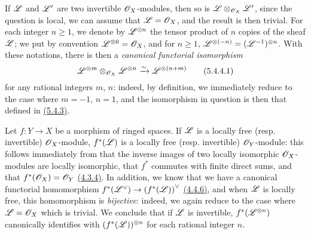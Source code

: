 \begin{env}[5.4.4]
\label{env-0.5.4.4}
If $\mathscr{L}$ and $\mathscr{L}'$ are two invertible $\mathscr{O}_X$-modules, then so is
$\mathscr{L}\otimes_{\mathscr{O}_X}\mathscr{L}'$, since the question is local, we can assume that
$\mathscr{L}=\mathscr{O}_X$, and the result is then trivial. For each integer $n\geqslant 1$,
we denote by $\mathscr{L}^{\otimes n}$ the tensor product of $n$ copies of the sheaf
$\mathscr{L}$; we put by convention $\mathscr{L}^{\otimes 0}=\mathscr{O}_X$, and for
$n\geqslant 1$, $\mathscr{L}^{\otimes(-n)}=(\mathscr{L}^{-1})^{\otimes n}$. With these
notations, there is then a {\em canonical functorial isomorphism}
\[
  \mathscr{L}^{\otimes m}\otimes_{\mathscr{O}_X}\mathscr{L}^{\otimes n}\xrightarrow{\sim}\mathscr{L}^{\otimes(n+m)}
  \tag{5.4.4.1}
\]
for any rational integers $m$, $n$: indeed, by definition, we immediately reduce
to the case where $m=-1$, $n=1$, and the isomorphism in question is then that
defined in \hyperref[env-0.5.4.3]{(5.4.3)}.
\end{env}

\begin{env}[5.4.5]
\label{env-0.5.4.5}
Let $f:Y\to X$ be a morphism of ringed spaces. If $\mathscr{L}$ is a locally free
(resp. invertible) $\mathscr{O}_X$-module, $f^*(\mathscr{L})$ is a locally free
(resp. invertible) $\mathscr{O}_Y$-module: this follows immediately from that the
inverse images of two locally isomorphic $\mathscr{O}_X$-modules are locally isomorphic,
that $f^*$ commutes with finite direct sums, and that $f^*(\mathscr{O}_X)=\mathscr{O}_Y$
\hyperref[env-0.4.3.4]{(4.3.4)}. In addition, we know that we have a canonical functorial
homomorphism $f^*({\mathscr{L}}^\vee)\to{(f^*(\mathscr{L}))}^\vee$ \hyperref[env-0.4.4.6]{(4.4.6)}, and
when $\mathscr{L}$ is locally free, this homomorphism is {\em bijective}: indeed, we
again reduce to the case where $\mathscr{L}=\mathscr{O}_X$ which is trivial. We conclude that
if $\mathscr{L}$ is invertible, $f^*(\mathscr{L}^{\otimes n})$ canonically identifies with
$(f^*(\mathscr{L}))^{\otimes n}$ for each rational integer $n$.
\end{env}

